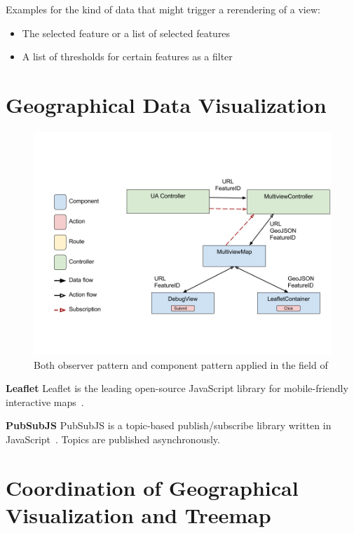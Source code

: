 Examples for the kind of data that might trigger a rerendering of a view:
\begin{itemize}
  \item
    The selected feature or a list of selected features
  \item
    A list of thresholds for certain features as a filter
\end{itemize}
\section{Geographical Data Visualization}





\begin{figure}[h!]
  \centering
  \includegraphics[width=\textwidth]{images/both-patterns-implemented.png}
  \caption{%
    Both observer pattern and component pattern applied in the field of \cmvs{}
  }\label{fig:implementation:both-patterns}
\end{figure}


\textbf{Leaflet}
Leaflet is the leading open-source JavaScript library for mobile-friendly interactive maps~\cite{Leaflet2017}.

\textbf{PubSubJS}
PubSubJS is a topic-based publish/subscribe library written in JavaScript~\cite{PubSubJS2017}.
Topics are published asynchronously.

\section{Coordination of Geographical Visualization and Treemap}

